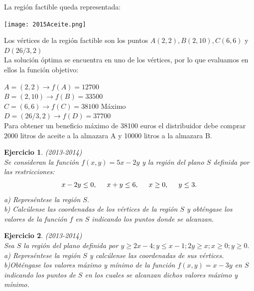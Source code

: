 \documentclass[12pt, a4paper]{amsart}
\newtheorem{ejer}{Ejercicio}
\newcommand{\s}{\color[rgb]{0,0,0.5}}
\newcommand{\n}{\color[rgb]{0,0,0}}
\begin{document}
La región factible queda representada:

\begin{center}
\texttt{[image: 2015Aceite.png]}
\end{center}


Los vértices de la región factible son los puntos $A(2,2), B(2,10), C(6,6)$ y $D(26/3,2)$\\


La solución óptima se encuentra en uno de los vértices, por lo que evaluamos en ellos la función objetivo:

 
$A=(2,2) \rightarrow f(A)=12700$ \\

$B=(2,10) \rightarrow f(B)=33500$\\

$C=(6,6) \rightarrow f(C)=38100$ Máximo\\

$D=(26/3,2) \rightarrow f(D)=37700$\\

Para obtener un beneficio máximo de 38100 euros el distribuidor debe comprar 2000 litros de aceite a la almazara A y 10000 litros a la almazara B.

\n


\begin{ejer}\em (2013-2014)\\
Se consideran la función $f(x,y)=5x-2y$ y la región del plano $S$ definida por las restricciones:
\[x-2y\leq 0,\hspace*{0.5cm} x+y\leq 6,\hspace*{0.5cm} x\geq 0,\hspace*{0.5cm} y\leq 3.\]
a) Represéntese la región $S.$\\
b) Calcúlense las coordenadas de los vértices de la región $S$ y obténgase los valores de la función $f$ en $S$ indicando los puntos donde se alcanzan.
\end{ejer}
\s

\n

\begin{ejer}\em  (2013-2014)\\
Sea $S$ la región del plano definida por
$y\geq 2x-4; y\leq x-1; 2y\geq x; x\geq 0; y\geq 0.$\\
a) Represéntese la región $S$ y calcúlense las coordenadas de sus vértices.\\
b)Obténgase los valores máximo y mínimo de la función $f(x,y)=x-3y$ en $S$ indicando los puntos de $S$ en los cuales se alcanzan dichos valores máximo y mínimo.
\end{ejer}
\s
\end{document}
